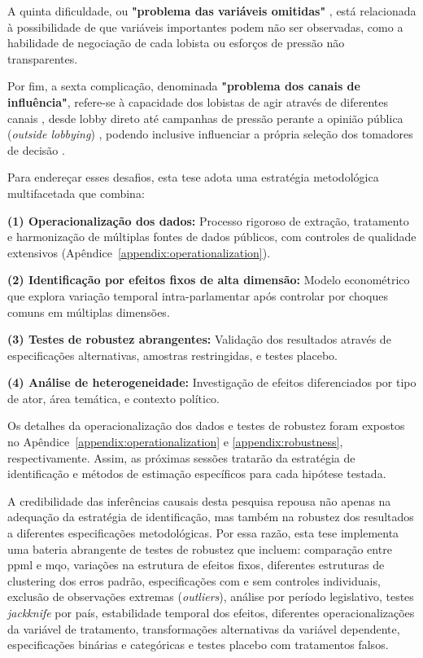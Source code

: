 A quinta dificuldade, ou \textbf{"problema das variáveis omitidas"} \cite{de_figueiredo_advancing_2014}, está relacionada à possibilidade de que variáveis importantes podem não ser observadas, como a habilidade de negociação de cada lobista ou esforços de pressão não transparentes.

Por fim, a sexta complicação, denominada \textbf{"problema dos canais de influência"}, refere-se à capacidade dos lobistas de agir através de diferentes canais \cite{dur_measuring_2008}, desde lobby direto até campanhas de pressão perante a opinião pública (\textit{outside lobbying}) \cite{kollman1998outside}, podendo inclusive influenciar a própria seleção dos tomadores de decisão \cite{fordham2003selection}.

Para endereçar esses desafios, esta tese adota uma estratégia metodológica multifacetada que combina:

\textbf{(1) Operacionalização dos dados:} Processo rigoroso de extração, tratamento e harmonização de múltiplas fontes de dados públicos, com controles de qualidade extensivos (Apêndice~\ref{appendix:operationalization}).

\textbf{(2) Identificação por efeitos fixos de alta dimensão:} Modelo econométrico que explora variação temporal intra-parlamentar após controlar por choques comuns em múltiplas dimensões.

\textbf{(3) Testes de robustez abrangentes:} Validação dos resultados através de especificações alternativas, amostras restringidas, e testes placebo.

\textbf{(4) Análise de heterogeneidade:} Investigação de efeitos diferenciados por tipo de ator, área temática, e contexto político.

Os detalhes da operacionalização dos dados e testes de robustez foram expostos no Apêndice~\ref{appendix:operationalization} e \ref{appendix:robustness}, respectivamente. Assim, as próximas sessões tratarão da estratégia de identificação e métodos de estimação específicos para cada hipótese testada.






A credibilidade das inferências causais desta pesquisa repousa não apenas na adequação da estratégia de identificação, mas também na robustez dos resultados a diferentes especificações metodológicas. Por essa razão, esta tese implementa uma bateria abrangente de testes de robustez que incluem: comparação entre \acrshort{ppml} e \acrshort{mqo}, variações na estrutura de efeitos fixos, diferentes estruturas de clustering dos erros padrão, especificações com e sem controles individuais, exclusão de observações extremas (\textit{outliers}), análise por período legislativo, testes \textit{jackknife} por país, estabilidade temporal dos efeitos, diferentes operacionalizações da variável de tratamento, transformações alternativas da variável dependente, especificações binárias e categóricas e testes placebo com tratamentos falsos.

